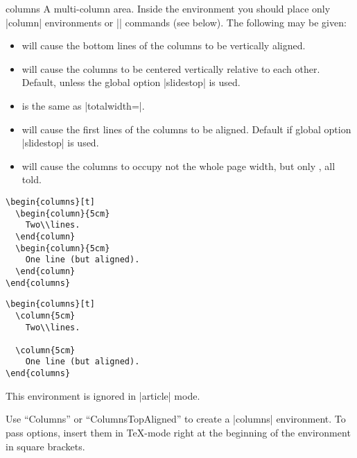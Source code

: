 \begin{environment}{{columns}}
  A multi-column area. Inside the environment you should place only
  |column| environments or |\column| commands (see below). The
  following  may be given: 
  \begin{itemize}
  \item
     will cause the bottom lines of the columns to be
    vertically aligned.
  \item
     will cause the columns to be centered vertically
    relative to each other. Default, unless the global option
    |slidestop| is used. 
  \item
     is the same as |totalwidth=\textwidth|.
  \item
     will cause the first lines of the columns to be
    aligned. Default if global option |slidestop| is used.
  \item
     will cause the columns to occupy
    not the whole page width, but only , all told.
  \end{itemize}
    
  \example
\begin{verbatim}
\begin{columns}[t]
  \begin{column}{5cm}
    Two\\lines.
  \end{column}
  \begin{column}{5cm}
    One line (but aligned).
  \end{column}
\end{columns}
\end{verbatim}
  
  \example
\begin{verbatim}
\begin{columns}[t]
  \column{5cm}
    Two\\lines.

  \column{5cm}
    One line (but aligned).
\end{columns}
\end{verbatim}

  \articlenote
  This environment is ignored in |article| mode.
  
  \lyxnote
  Use ``Columns'' or ``ColumnsTopAligned'' to create a |columns|
  environment. To pass options, insert them in \TeX-mode right at the
  beginning of the environment in square brackets.
\end{environment}

